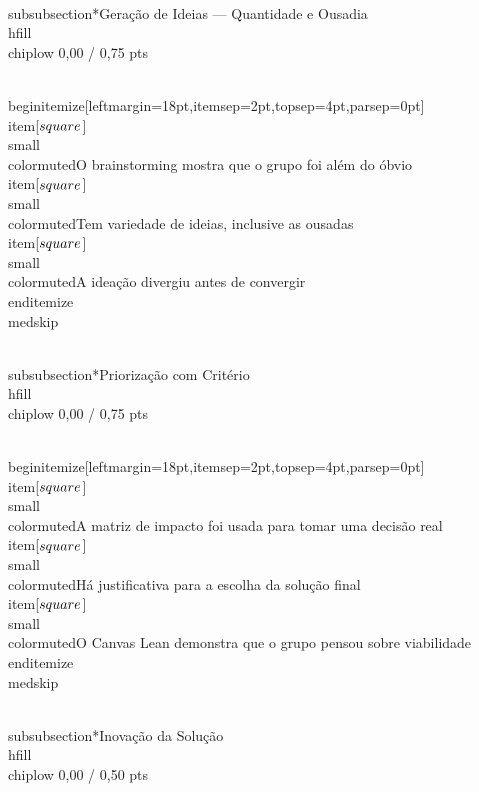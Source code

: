 \documentclass[11pt, a4paper]{article}
\newcommand{\chiplow}[1]{\colorbox{crimsondim}{\color{crimson}\semibold\small\strut\ #1\ }}
\begin{document}
\\subsubsection*{Geração de Ideias — Quantidade e Ousadia \\hfill {\\chiplow 0,00 / 0,75 pts}}

\\begin{itemize}[leftmargin=18pt,itemsep=2pt,topsep=4pt,parsep=0pt]
  \\item[$\\square$] {\\small\\color{muted}O brainstorming mostra que o grupo foi além do óbvio}
  \\item[$\\square$] {\\small\\color{muted}Tem variedade de ideias, inclusive as ousadas}
  \\item[$\\square$] {\\small\\color{muted}A ideação divergiu antes de convergir}
\\end{itemize}
\\medskip

\\subsubsection*{Priorização com Critério \\hfill {\\chiplow 0,00 / 0,75 pts}}

\\begin{itemize}[leftmargin=18pt,itemsep=2pt,topsep=4pt,parsep=0pt]
  \\item[$\\square$] {\\small\\color{muted}A matriz de impacto foi usada para tomar uma decisão real}
  \\item[$\\square$] {\\small\\color{muted}Há justificativa para a escolha da solução final}
  \\item[$\\square$] {\\small\\color{muted}O Canvas Lean demonstra que o grupo pensou sobre viabilidade}
\\end{itemize}
\\medskip

\\subsubsection*{Inovação da Solução \\hfill {\\chiplow 0,00 / 0,50 pts}}
\end{document}
